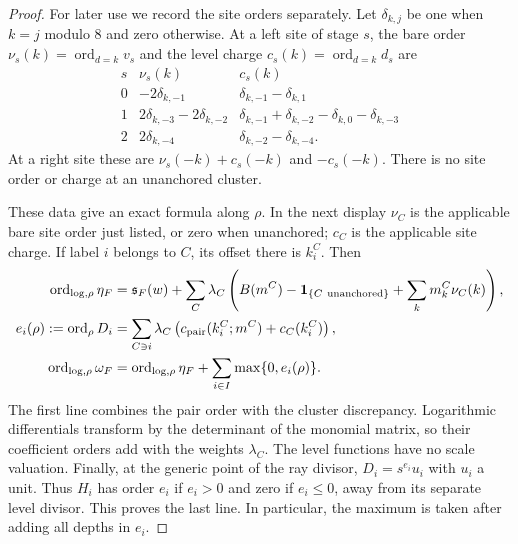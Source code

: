\begin{proof}
For later use we record the site orders separately. Let
$\delta_{k,j}$ be one when $k=j$ modulo $8$ and zero otherwise. At a left
site of stage $s$, the bare order $\nu_s(k)=\operatorname{ord}_{d=k}v_s$
and the level charge $c_s(k)=\operatorname{ord}_{d=k}d_s$ are
\begin{equation}\label{eq:residue-site-charges}
\begin{array}{c|c|c}
s&\nu_s(k)&c_s(k)\\ \hline
0&-2\delta_{k,-1}&\delta_{k,-1}-\delta_{k,1}\\
1&2\delta_{k,-3}-2\delta_{k,-2}
 &\delta_{k,-1}+\delta_{k,-2}-\delta_{k,0}-\delta_{k,-3}\\
2&2\delta_{k,-4}&\delta_{k,-2}-\delta_{k,-4}.
\end{array}
\end{equation}
At a right site these are $\nu_s(-k)+c_s(-k)$ and $-c_s(-k)$.
There is no site order or charge at an unanchored cluster.

These data give an exact formula along $\rho$. In the next display
$\nu_C$ is the applicable bare site order just listed, or zero when
unanchored; $c_C$ is the applicable site charge. If label $i$ belongs
to $C$, its offset there is $k_i^C$. Then
\begin{align}
 \operatorname{ord}_{\log,\rho}\eta_F
 &=\mathfrak s_F(w)+\sum_C\lambda_C
   \left(B(m^C)-\mathbf1_{\{C\ {\rm unanchored}\}}
                  +\sum_km_k^C\nu_C(k)\right),\label{eq:residue-bare-order}\\
 e_i(\rho):=\operatorname{ord}_\rho D_i
 &=\sum_{C\ni i}\lambda_C
    \left(c_{\rm pair}(k_i^C;m^C)+c_C(k_i^C)\right),\label{eq:residue-level-order}\\
 \operatorname{ord}_{\log,\rho}\omega_F
 &=\operatorname{ord}_{\log,\rho}\eta_F
      +\sum_{i\in I}\max\{0,e_i(\rho)\}.\label{eq:residue-final-order}
\end{align}
The first line combines the pair order with the cluster discrepancy.
Logarithmic differentials transform by the determinant of the monomial
matrix, so their coefficient orders add with the weights $\lambda_C$.
The level functions have no scale valuation. Finally, at the generic
point of the ray divisor, $D_i=s^{e_i}u_i$ with $u_i$ a unit. Thus
$H_i$ has order $e_i$ if $e_i>0$ and zero if $e_i\le0$, away from its
separate level divisor. This proves the last line. In particular, the
maximum is taken after adding all depths in $e_i$.


\end{proof}
